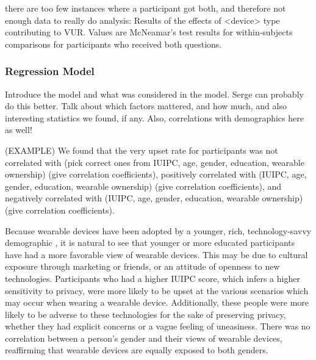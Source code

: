 \documentclass{acm_proc_article-sp}
\begin{document}
there are too few instances where a participant got both, and therefore not enough data to really do analysis: Results of the effects of <device> type contributing to VUR. Values are McNeamar's test results for within-subjects comparisons for participants who received both questions.


\subsubsection{Regression Model} 
Introduce the model and what was considered in the model. Serge can probably do this better. Talk about which factors mattered, and how much, and also interesting statistics we found, if any. Also, correlations with demographics here as well! 

(EXAMPLE) We found that the very upset rate for participants was not correlated with (pick correct ones from IUIPC, age, gender, education, wearable ownership) (give correlation coefficients), positively correlated with  (IUIPC, age, gender, education, wearable ownership) (give correlation coefficients), and negatively correlated with  (IUIPC, age, gender, education, wearable ownership) (give correlation coefficients). 

Because wearable devices have been adopted by a younger, rich, technology-savvy demographic  \cite{cmo}, it is natural to see that younger or more educated participants have had a more favorable view of wearable devices. This may be due to cultural exposure through marketing or friends, or an attitude of openness to new technologies. Participants who had a higher IUIPC score, which infers a higher sensitivity to privacy, were more likely to be upset at the various scenarios which may occur when wearing a wearable device. Additionally, these people were more likely to be adverse to these technologies for the sake of preserving privacy, whether they had explicit concerns or a vague feeling of uneasiness. There was no correlation between a person's gender and their views of wearable devices, reaffirming that wearable devices are equally exposed to both genders. 
\end{document}
